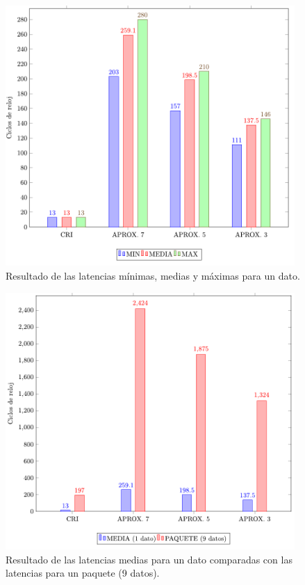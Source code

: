 \begin{figure}[H]
    \centering
    \includegraphics[width=11cm]{Figuras/Graf_Bar_CRI.pdf}
    \caption{Resultado de las latencias mínimas, medias y máximas para un dato.}
    \label{fig:graf-uno}
\end{figure}

\begin{figure}[H]
    \centering
    \includegraphics[width=11cm]{Figuras/Graf_Bar_CRI_Paquete.pdf}
    \caption{Resultado de las latencias medias para un dato comparadas con las latencias para un paquete (9 datos).}
    \label{fig:graf-pack}
\end{figure}


